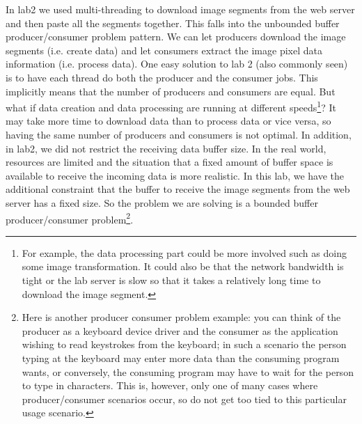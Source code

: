 In lab2 we used multi-threading to download image segments from the web server and then paste all the segments together. This falls into the unbounded buffer producer/consumer problem pattern. We can let producers download the image segments (i.e. create data) and let consumers extract the image pixel data information (i.e. process data). One easy solution to lab 2 (also commonly seen) is to have each thread do both the producer and the consumer jobs. This implicitly means that the number of producers and consumers are equal. But what if data creation and data processing are running at different speeds\footnote{For example, the data processing part could be more involved such as doing some image transformation. It could also be that the network bandwidth is tight or the lab server is slow so that it takes a relatively long time to download the image segment.}? It may take more time to download data than to process data or vice versa, so having the same number of producers and consumers is not optimal. In addition, in lab2, we did not restrict the receiving data buffer size. In the real world, resources are limited and the situation that a fixed amount of buffer space is available to receive the incoming data is more realistic. In this lab, we have the additional constraint that the buffer to receive the image segments from the web server has a fixed size. So the problem we are solving is a bounded buffer producer/consumer problem\footnote{Here is another producer consumer problem example: you can think of the producer as a keyboard device driver and the consumer as the application wishing to read keystrokes from the keyboard; in such a scenario the person typing at the keyboard may enter more data than the consuming  program wants, or conversely, the consuming program may have to wait  for the person to type in characters. This is, however, only one of many cases where producer/consumer scenarios occur, so do not get too tied to this particular usage scenario.}.




